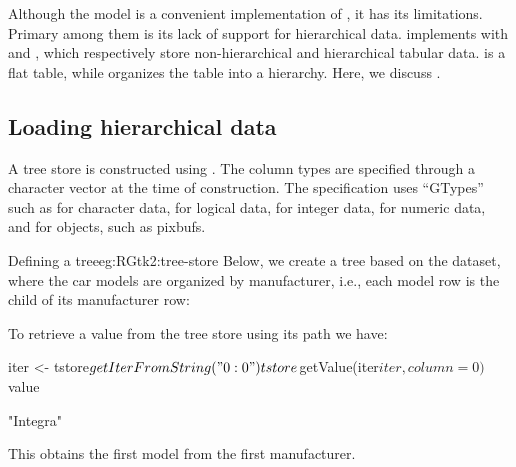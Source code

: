 Although the  model is a convenient implementation
of , it has its limitations. Primary among them is
its lack of support for hierarchical data. \GTK\/ implements
 with  and
, which respectively store non-hierarchical and
hierarchical tabular data.  is a flat table,
while  organizes the table into a hierarchy. Here,
we discuss .

\subsection{Loading hierarchical data}
  

A tree store is constructed using . The
column types are specified through a character vector at the time of
construction. The specification uses ``GTypes'' such as
 for character data,  for logical
data,  for integer data,  for numeric data,
and  for \GTK\/ objects, such as pixbufs.

\begin{example}{Defining a tree}{eg:RGtk2:tree-store}
  Below, we create a tree based on the  dataset, where
  the car models are organized by manufacturer, i.e., each model row
  is the child of its manufacturer row:
\begin{Schunk}
\end{Schunk}
  To retrieve a value from the tree store using its path we have:
\begin{Schunk}
\begin{Sinput}
 iter <- tstore$getIterFromString("0:0")
 tstore$getValue(iter$iter, column = 0)$value
\end{Sinput}
\begin{Soutput}
[1] "Integra"
\end{Soutput}
\end{Schunk}
This obtains the first model from the first manufacturer.

\end{example}

